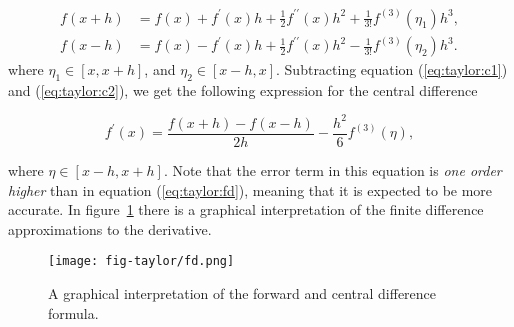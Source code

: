 \documentclass[graybox,sectrefs,envcountresetchap,open=right,final]{svmonodo}
\begin{document}
\begin{align}
f(x+h)&=f(x)+f^\prime(x)h+\frac{1}{2}f^{\prime\prime}(x)h^2+\frac{1}{3!}f^{(3)}(\eta_1)h^3,   
\label{eq:taylor:c1}\\ 
f(x-h)&=f(x)-f^\prime(x)h+\frac{1}{2}f^{\prime\prime}(x)h^2-\frac{1}{3!}f^{(3)}(\eta_2)h^3.
\label{eq:taylor:c2}
\end{align}
where $\eta_1\in[x,x+h]$, and $\eta_2\in[x-h,x]$. Subtracting  equation (\ref{eq:taylor:c1}) and (\ref{eq:taylor:c2}), we get the following expression for the central difference 

\begin{equation}
f^\prime(x)=\frac{f(x+h)-f(x-h)}{2h} -\frac{h^2}{6}f^{(3)}(\eta),\label{eq:taylor:cd}
\end{equation}

where $\eta\in[x-h,x+h]$. Note that the error term in this equation is \emph{one order higher} than in equation (\ref{eq:taylor:fd}), meaning that it is expected to be more accurate. In figure~\ref{fig:taylor:fd} there is a graphical interpretation of the finite difference approximations to the derivative. 

\begin{figure}[!ht]  %
  \centerline{\texttt{[image: fig-taylor/fd.png]}}
  \caption{
  A graphical interpretation of the forward and central difference formula. \label{fig:taylor:fd}
  }
\end{figure}
\end{document}
